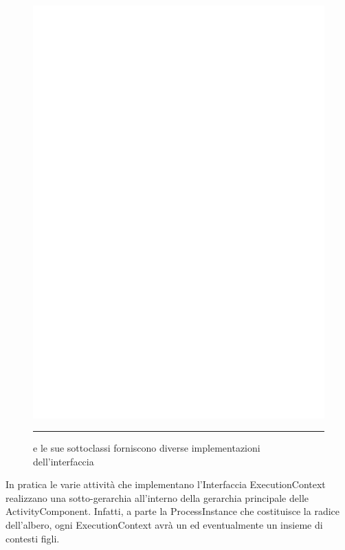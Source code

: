 \begin{figure}[t!]
\begin{center}
\includegraphics[scale=0.85]
{architettura_interna/dia/cntxclass}
\caption[ExecutionContext Class Diagram]{
   	 e le sue sottoclassi forniscono 
   	diverse implementazioni dell'interfaccia	 }
   	\rule{7cm}{0.01cm}
  \label{fig:cntxclass}
\end{center}
\end{figure}

In pratica le varie attività che implementano l'Interfaccia ExecutionContext
realizzano una sotto-gerarchia all'interno della gerarchia principale delle
ActivityComponent. Infatti, a parte la ProcessInstance che costituisce la
radice dell'albero, ogni ExecutionContext avrà un  ed
eventualmente un insieme di contesti figli.

